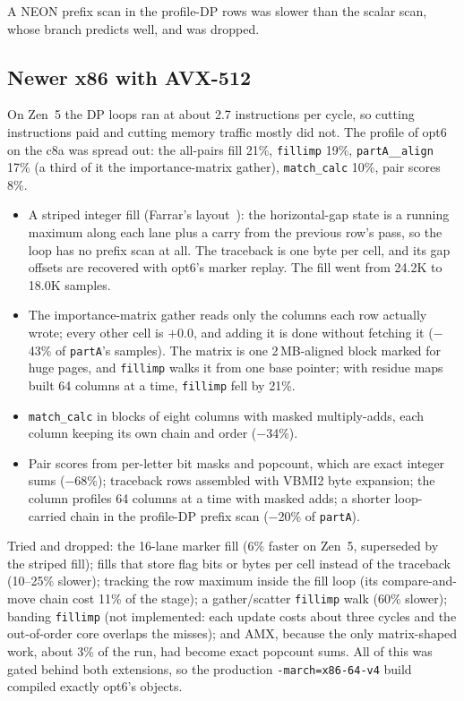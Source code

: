 \documentclass[11pt]{article}
\newcommand{\code}[1]{\texttt{#1}}
\begin{document}
A NEON prefix scan in the profile-DP rows was slower than the scalar scan, whose branch
predicts well, and was dropped.

\subsection{Newer x86 with AVX-512}

On Zen~5 the DP loops ran at about 2.7 instructions per cycle, so cutting instructions paid and
cutting memory traffic mostly did not. The profile of opt6 on the c8a was spread out: the
all-pairs fill 21\%, \code{fillimp} 19\%, \code{partA\_\_align} 17\% (a third of it the
importance-matrix gather), \code{match\_calc} 10\%, pair scores 8\%.

\begin{itemize}
\item A striped integer fill (Farrar's layout~\cite{farrar2007}): the horizontal-gap state is a
  running maximum along each lane plus a carry from the previous row's pass, so the loop has no
  prefix scan at all. The traceback is one byte per cell, and its gap offsets are recovered
  with opt6's marker replay. The fill went from 24.2K to 18.0K samples.
\item The importance-matrix gather reads only the columns each row actually wrote; every other
  cell is $+0.0$, and adding it is done without fetching it ($-$43\% of \code{partA}'s
  samples). The matrix is one 2\,MB-aligned block marked for huge pages, and \code{fillimp}
  walks it from one base pointer; with residue maps built 64 columns at a time, \code{fillimp}
  fell by 21\%.
\item \code{match\_calc} in blocks of eight columns with masked multiply-adds, each column
  keeping its own chain and order ($-$34\%).
\item Pair scores from per-letter bit masks and popcount, which are exact integer sums ($-$68\%);
  traceback rows assembled with VBMI2 byte expansion; the column profiles 64 columns at a time
  with masked adds; a shorter loop-carried chain in the profile-DP prefix scan ($-$20\% of
  \code{partA}).
\end{itemize}

Tried and dropped: the 16-lane marker fill (6\% faster on Zen~5, superseded by the striped
fill); fills that store flag bits or bytes per cell instead of the traceback (10--25\% slower);
tracking the row maximum inside the fill loop (its compare-and-move chain cost 11\% of the
stage); a gather/scatter \code{fillimp} walk (60\% slower); banding \code{fillimp} (not
implemented: each update costs about three cycles and the out-of-order core overlaps the
misses); and AMX, because the only matrix-shaped work, about 3\% of the run, had become exact
popcount sums. All of this was gated behind both extensions, so the production
\code{-march=x86-64-v4} build compiled exactly opt6's objects.
\end{document}
